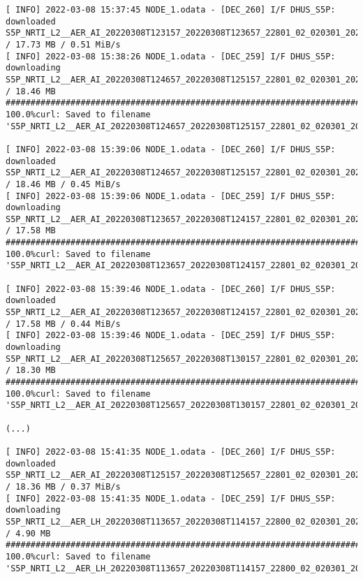 \documentclass[dec_sum_main.tex]{subfiles}
\begin{document}
\begin{Verbatim}[fontsize=\tiny]
[ INFO] 2022-03-08 15:37:45 NODE_1.odata - [DEC_260] I/F DHUS_S5P: downloaded S5P_NRTI_L2__AER_AI_20220308T123157_20220308T123657_22801_02_020301_20220308T133043 / 17.73 MB / 0.51 MiB/s
[ INFO] 2022-03-08 15:38:26 NODE_1.odata - [DEC_259] I/F DHUS_S5P: downloading S5P_NRTI_L2__AER_AI_20220308T124657_20220308T125157_22801_02_020301_20220308T133531 / 18.46 MB
################################################################################################################################################################################## 100.0%curl: Saved to filename 'S5P_NRTI_L2__AER_AI_20220308T124657_20220308T125157_22801_02_020301_20220308T133531.nc'

[ INFO] 2022-03-08 15:39:06 NODE_1.odata - [DEC_260] I/F DHUS_S5P: downloaded S5P_NRTI_L2__AER_AI_20220308T124657_20220308T125157_22801_02_020301_20220308T133531 / 18.46 MB / 0.45 MiB/s
[ INFO] 2022-03-08 15:39:06 NODE_1.odata - [DEC_259] I/F DHUS_S5P: downloading S5P_NRTI_L2__AER_AI_20220308T123657_20220308T124157_22801_02_020301_20220308T133503 / 17.58 MB
################################################################################################################################################################################## 100.0%curl: Saved to filename 'S5P_NRTI_L2__AER_AI_20220308T123657_20220308T124157_22801_02_020301_20220308T133503.nc'

[ INFO] 2022-03-08 15:39:46 NODE_1.odata - [DEC_260] I/F DHUS_S5P: downloaded S5P_NRTI_L2__AER_AI_20220308T123657_20220308T124157_22801_02_020301_20220308T133503 / 17.58 MB / 0.44 MiB/s
[ INFO] 2022-03-08 15:39:46 NODE_1.odata - [DEC_259] I/F DHUS_S5P: downloading S5P_NRTI_L2__AER_AI_20220308T125657_20220308T130157_22801_02_020301_20220308T133755 / 18.30 MB
################################################################################################################################################################################## 100.0%curl: Saved to filename 'S5P_NRTI_L2__AER_AI_20220308T125657_20220308T130157_22801_02_020301_20220308T133755.nc'

(...)

[ INFO] 2022-03-08 15:41:35 NODE_1.odata - [DEC_260] I/F DHUS_S5P: downloaded S5P_NRTI_L2__AER_AI_20220308T125157_20220308T125657_22801_02_020301_20220308T133654 / 18.36 MB / 0.37 MiB/s
[ INFO] 2022-03-08 15:41:35 NODE_1.odata - [DEC_259] I/F DHUS_S5P: downloading S5P_NRTI_L2__AER_LH_20220308T113657_20220308T114157_22800_02_020301_20220308T132756 / 4.90 MB
################################################################################################################################################################################## 100.0%curl: Saved to filename 'S5P_NRTI_L2__AER_LH_20220308T113657_20220308T114157_22800_02_020301_20220308T132756.nc'


\end{Verbatim}
\end{document}
